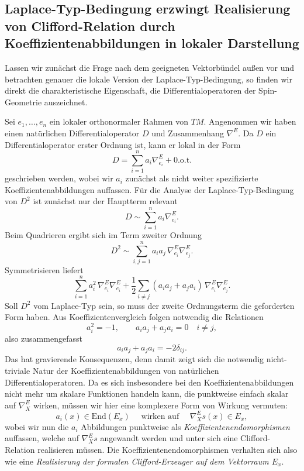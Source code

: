 \documentclass[10pt, letterpaper]{article}
\newcommand{\End}{\mathrm{End}}
\begin{document}
\subsection{Laplace-Typ-Bedingung erzwingt Realisierung von Clifford-Relation durch Koeffizientenabbildungen in lokaler Darstellung}

Lassen wir zunächst die Frage nach dem geeigneten Vektorbündel außen vor und betrachten genauer die lokale Version der Laplace-Typ-Bedingung, so finden wir direkt die charakteristische Eigenschaft, die Differentialoperatoren der Spin-Geometrie auszeichnet.



Sei \(e_1,\dots,e_n\) ein lokaler orthonormaler Rahmen von \(TM\). Angenommen wir haben einen natürlichen Differentialoperator $D$ und Zusammenhang $\nabla^E$. Da \(D\) ein Differentialoperator erster Ordnung ist, kann er lokal in der Form
\[
D=\sum_{i=1}^n a_i\nabla^E_{e_i}+ \text{0.o.t.}
\]
geschrieben werden, wobei wir $a_i$ zunächst als nicht weiter spezifizierte Koeffizientenabbildungen auffassen. Für die Analyse der Laplace-Typ-Bedingung von \(D^2\) ist zunächst nur der Hauptterm relevant
\[
D\sim \sum_{i=1}^n a_i\nabla^E_{e_i}.
\]
Beim Quadrieren ergibt sich im Term zweiter Ordnung
\[
D^2\sim \sum_{i,j=1}^n a_i a_j\,\nabla^E_{e_i}\nabla^E_{e_j}.
\]
Symmetrisieren liefert
\[
\sum_{i=1}^n a_i^2\,\nabla^E_{e_i}\nabla^E_{e_i}
+\frac12\sum_{i\neq j}(a_i a_j+a_j a_i)\,\nabla^E_{e_i}\nabla^E_{e_j}.
\]
Soll \(D^2\) vom Laplace-Typ sein, so muss der zweite Ordnungsterm die geforderten Form haben. Aus Koeffizientenvergleich folgen notwendig die Relationen
\[
a_i^2=-1,
\qquad
a_i a_j+a_j a_i=0 \quad i\neq j,
\]
also zusammengefasst
\[
a_i a_j+a_j a_i=-2\delta_{ij}.
\]
Das hat gravierende Konsequenzen, denn damit zeigt sich die notwendig nicht-triviale Natur der Koeffizientenabbildungen von natürlichen Differentialoperatoren. Da es sich insbesondere bei den Koeffizientenabbildungen nicht mehr um skalare Funktionen handeln kann, die punktweise einfach skalar auf $\nabla^E_{X}$ wirken, müssen wir hier eine komplexere Form von Wirkung vermuten:
$$a_i(x)\in\End(E_x) \quad \text{ wirken auf }\quad  \nabla^E_Xs(x)\in E_x,$$
wobei wir nun die $a_i$ Abbildungen punktweise als \emph{Koeffizientenendomorphismen} auffassen, welche auf $\nabla^E_X s$ angewandt werden und unter sich eine Clifford-Relation realisieren müssen. Die Koeffizientenendomorphismen verhalten sich also wie eine \emph{Realisierung der formalen Clifford-Erzeuger auf dem Vektorraum $E_x$}.
\end{document}
